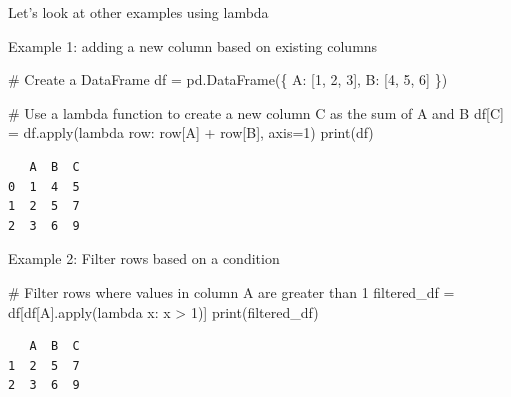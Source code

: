 \documentclass[
  letterpaper,
  DIV=11,
  numbers=noendperiod]{scrreprt}
\newenvironment{Shaded}{\begin{snugshade}}{\end{snugshade}}
\newcommand{\BuiltInTok}[1]{\textcolor[rgb]{0.00,0.23,0.31}{#1}}
\newcommand{\CommentTok}[1]{\textcolor[rgb]{0.37,0.37,0.37}{#1}}
\newcommand{\DecValTok}[1]{\textcolor[rgb]{0.68,0.00,0.00}{#1}}
\newcommand{\KeywordTok}[1]{\textcolor[rgb]{0.00,0.23,0.31}{#1}}
\newcommand{\NormalTok}[1]{\textcolor[rgb]{0.00,0.23,0.31}{#1}}
\newcommand{\OperatorTok}[1]{\textcolor[rgb]{0.37,0.37,0.37}{#1}}
\newcommand{\StringTok}[1]{\textcolor[rgb]{0.13,0.47,0.30}{#1}}
\begin{document}
Let's look at other examples using lambda

Example 1: adding a new column based on existing columns

\begin{Shaded}
\begin{Highlighting}[]
\CommentTok{\# Create a DataFrame}
\NormalTok{df }\OperatorTok{=}\NormalTok{ pd.DataFrame(\{}
    \StringTok{\textquotesingle{}A\textquotesingle{}}\NormalTok{: [}\DecValTok{1}\NormalTok{, }\DecValTok{2}\NormalTok{, }\DecValTok{3}\NormalTok{],}
    \StringTok{\textquotesingle{}B\textquotesingle{}}\NormalTok{: [}\DecValTok{4}\NormalTok{, }\DecValTok{5}\NormalTok{, }\DecValTok{6}\NormalTok{]}
\NormalTok{\})}

\CommentTok{\# Use a lambda function to create a new column \textquotesingle{}C\textquotesingle{} as the sum of \textquotesingle{}A\textquotesingle{} and \textquotesingle{}B\textquotesingle{}}
\NormalTok{df[}\StringTok{\textquotesingle{}C\textquotesingle{}}\NormalTok{] }\OperatorTok{=}\NormalTok{ df.}\BuiltInTok{apply}\NormalTok{(}\KeywordTok{lambda}\NormalTok{ row: row[}\StringTok{\textquotesingle{}A\textquotesingle{}}\NormalTok{] }\OperatorTok{+}\NormalTok{ row[}\StringTok{\textquotesingle{}B\textquotesingle{}}\NormalTok{], axis}\OperatorTok{=}\DecValTok{1}\NormalTok{)}
\BuiltInTok{print}\NormalTok{(df)}
\end{Highlighting}
\end{Shaded}

\begin{verbatim}
   A  B  C
0  1  4  5
1  2  5  7
2  3  6  9
\end{verbatim}

Example 2: Filter rows based on a condition

\begin{Shaded}
\begin{Highlighting}[]
\CommentTok{\# Filter rows where values in column \textquotesingle{}A\textquotesingle{} are greater than 1}
\NormalTok{filtered\_df }\OperatorTok{=}\NormalTok{ df[df[}\StringTok{\textquotesingle{}A\textquotesingle{}}\NormalTok{].}\BuiltInTok{apply}\NormalTok{(}\KeywordTok{lambda}\NormalTok{ x: x }\OperatorTok{\textgreater{}} \DecValTok{1}\NormalTok{)]}
\BuiltInTok{print}\NormalTok{(filtered\_df)}
\end{Highlighting}
\end{Shaded}

\begin{verbatim}
   A  B  C
1  2  5  7
2  3  6  9
\end{verbatim}
\end{document}
